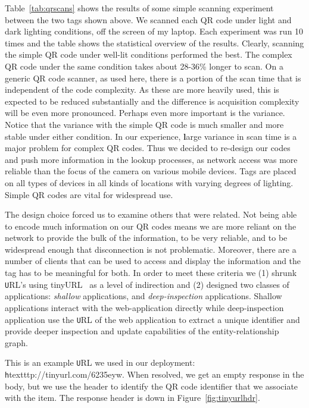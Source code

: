Table~\ref{tab:qrscans} shows the results of some simple scanning experiment between the two tags
shown above.  We scanned each QR code under light and dark lighting conditions, off the screen of my laptop.
Each experiment was run 10 times and the table shows the statistical
overview of the results. 
Clearly, scanning the simple QR code under well-lit conditions
performed the best.  The complex QR code under the same condition takes about 28-36\% longer to scan.
On a generic QR code scanner, as used here, there is a portion of the
scan time that is independent of the code complexity.  As these are
more heavily used, this is expected to be reduced substantially and
the difference is acquisition complexity will be even more pronounced.
Perhaps even more important is the variance.  Notice that the variance with the simple QR code is much smaller and
more stable under either condition.  In our experience, {\textbf large variance in scan time is a major
problem for complex QR codes}.  Thus we decided to re-design our codes and push more information in the lookup
processes, as network access was more reliable than the focus of the camera on various mobile devices.
Tags are placed on all types of devices in all kinds of locations with varying degrees of lighting.
Simple QR codes are vital for widespread use.

The design choice forced us to examine others that were related.  Not being able to encode much information on 
our QR codes means we are more reliant on the network to provide the bulk of the information, to be very reliable,
and to be widespread enough that disconnection is not problematic.  Moreover, there are a number of clients
that can be used to access and display the information and the tag has to be meaningful for both.
In order to meet these criteria we (1) shrunk {\texttt URL}'s using tinyURL~\cite{tinyurl} as a level of 
indirection and 
(2) designed two classes of applications: \emph{shallow} applications, and \emph{deep-inspection} applications.  Shallow
applications interact with the web-application directly while deep-inspection application use
the {\texttt URL} of the web application to extract a unique identifier and provide deeper inspection
and update capabilities of the entity-relationship graph.

This is an example {\texttt URL} we used in our deployment: {\texttt htextttp://tinyurl.com/6235eyw}.
When resolved, we get an empty response in the body, but we use the header to identify the QR code identifier 
that we associate with the item.  The response header is down in Figure~\ref{fig:tinyurlhdr}.

